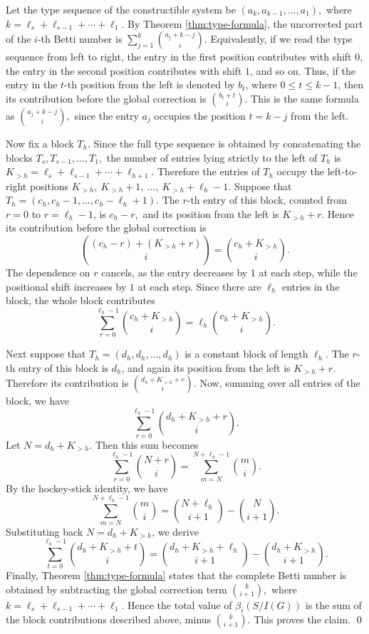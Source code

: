 \documentclass[12pt]{article}
\theoremstyle{definition}
\renewenvironment{proof}{{\bf \noindent Proof.}}{\qed}
\begin{document}
\begin{proof}
	Let the type sequence of the constructible system be
	$ (a_k,a_{k-1},\ldots,a_1), $
	where $k=\ell_s+\ell_{s-1}+\cdots+\ell_1$.  By Theorem
	\ref{thm:type-formula}, the uncorrected part of the $i$-th Betti number is
	$ \sum_{j=1}^{k}\binom{a_j+k-j}{i}. $
	Equivalently, if we read the type sequence from left to right, the entry in
	the first position contributes with shift $0$, the entry in the second
	position contributes with shift $1$, and so on.  Thus, if the entry in the
	$t$-th position from the left is denoted by $b_t$, where
	$0\leq t\leq k-1$, then its contribution before the global correction is
	$ \binom{b_t+t}{i}. $
	This is the same formula as
	$ \binom{a_j+k-j}{i}, $ since the entry $a_j$ occupies the position $t=k-j$ from the left.
	
	Now fix a block $T_h$.  Since the full type sequence is obtained by
	concatenating the blocks
	$ T_s,T_{s-1},\ldots,T_1, $
	the number of entries lying strictly to the left of $T_h$ is
	$ K_{>h}=\ell_s+\ell_{s-1}+\cdots+\ell_{h+1}. $
	Therefore the entries of $T_h$ occupy the left-to-right positions
	$ K_{>h},\ K_{>h}+1,\ \ldots,\ K_{>h}+\ell_h-1. $
	 Suppose that
	$ T_h=(c_h,c_h-1,\ldots,c_h-\ell_h+1). $
	The $r$-th entry of this block, counted from $r=0$ to $r=\ell_h-1$, is
	$ c_h-r, $
	and its position from the left is
	$ K_{>h}+r. $
	Hence its contribution before the global correction is
	$$
	\binom{(c_h-r)+(K_{>h}+r)}{i}
	=
	\binom{c_h+K_{>h}}{i}.
	$$
	The dependence on $r$ cancels, as the entry decreases by $1$ at each step,
	while the positional shift increases by $1$ at each step.  Since there are
	$\ell_h$ entries in the block, the whole block contributes
	$$
	\sum_{r=0}^{\ell_h-1}\binom{c_h+K_{>h}}{i}
	=
	\ell_h\binom{c_h+K_{>h}}{i}.
	$$
	
	 Next suppose that
	$ T_h=(d_h,d_h,\ldots,d_h) $ is a constant block of length $\ell_h$.  The $r$-th entry of this block is
	$d_h$, and again its position from the left is $K_{>h}+r$.  Therefore its
	contribution is $
	\binom{d_h+K_{>h}+r}{i}. $
	Now, summing over all entries of the block, we have
	$$
	\sum_{r=0}^{\ell_h-1}\binom{d_h+K_{>h}+r}{i}.
	$$
	Let $
	N=d_h+K_{>h}. $
	Then this sum becomes
	$$
	\sum_{r=0}^{\ell_h-1}\binom{N+r}{i}
	=
	\sum_{m=N}^{N+\ell_h-1}\binom{m}{i}.
	$$
	By the hockey-stick identity, we have
	$$
	\sum_{m=N}^{N+\ell_h-1}\binom{m}{i}
	=
	\binom{N+\ell_h}{i+1}-\binom{N}{i+1}.
	$$
	Substituting back $N=d_h+K_{>h}$, we derive
	$$
	\sum_{t=0}^{\ell_h-1}\binom{d_h+K_{>h}+t}{i}
	=
	\binom{d_h+K_{>h}+\ell_h}{i+1}
	-
	\binom{d_h+K_{>h}}{i+1}.
	$$
	 Finally, Theorem \ref{thm:type-formula} states that the complete Betti
	number is obtained by subtracting the global correction term
	$ \binom{k}{i+1}, $
	where
	$ k=\ell_s+\ell_{s-1}+\cdots+\ell_1. $
	Hence the total value of $\beta_i(S/I(G))$ is the sum of the block
	contributions described above, minus $\binom{k}{i+1}$.  This proves the
	claim.
\end{proof}
\end{document}
